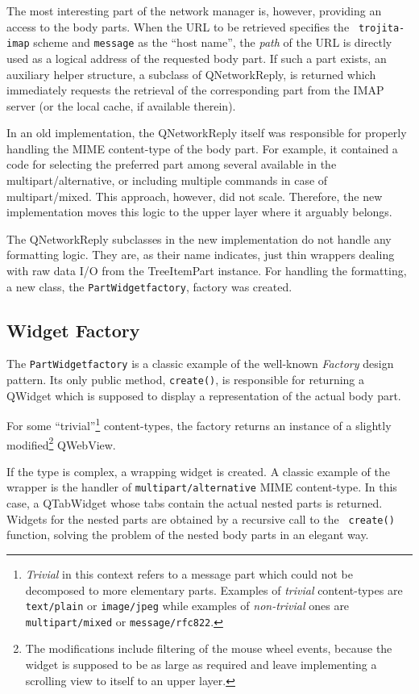 \documentclass[12pt,notitlepage]{report}
\begin{document}
The most interesting part of the network manager is, however, providing an
access to the body parts.  When the URL to be retrieved specifies the {\tt
trojita-imap} scheme and {\tt message} as the ``host name'', the {\em path} of
the URL is directly used as a logical address of the requested body part.  If
such a part exists, an auxiliary helper structure, a subclass of QNetworkReply,
is returned which immediately requests the retrieval of the corresponding part
from the IMAP server (or the local cache, if available therein).

In an old implementation, the QNetworkReply itself was responsible for properly
handling the MIME content-type of the body part.  For example, it contained a
code for selecting the preferred part among several available in the
multipart/alternative, or including multiple commands in case of
multipart/mixed.  This approach, however, did not scale.  Therefore, the new
implementation moves this logic to the upper layer where it arguably belongs.

The QNetworkReply subclasses in the new implementation do not handle any
formatting logic.  They are, as their name indicates, just thin wrappers dealing
with raw data I/O from the TreeItemPart instance.  For handling the formatting,
a new class, the {\tt PartWidgetfactory}, factory was created.

\subsection{Widget Factory}

The {\tt PartWidgetfactory} is a classic example of the well-known {\em Factory}
design pattern.  Its only public method, {\tt create()}, is responsible for
returning a QWidget which is supposed to display a representation of the actual
body part.

For some ``trivial''\footnote{{\em Trivial} in this context refers to a message
part which could not be decomposed to more elementary parts.  Examples of {\em
trivial} content-types are {\tt text/plain} or {\tt image/jpeg} while examples
of {\em non-trivial} ones are {\tt multipart/mixed} or {\tt message/rfc822}.}
content-types, the factory returns an instance of a slightly
modified\footnote{The modifications include filtering of the mouse wheel events,
because the widget is supposed to be as large as required and leave implementing
a scrolling view to itself to an upper layer.} QWebView.

If the type is complex, a wrapping widget is created.  A classic example of the
wrapper is the handler of {\tt multipart/alternative} MIME content-type.  In
this case, a QTabWidget whose tabs contain the actual nested parts is returned.
Widgets for the nested parts are obtained by a recursive call to the {\tt
create()} function, solving the problem of the nested body parts in an elegant
way.
\end{document}
